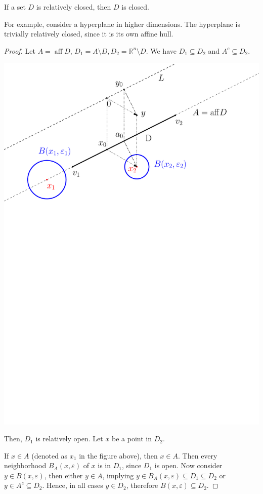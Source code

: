 \begin{theorem}
  If a set \( D \) is relatively closed, then \( D \) is closed.
\end{theorem}

For example, consider a hyperplane in higher dimensions. The hyperplane is
trivially relatively closed, since it is its own affine hull.

\begin{proof}
  Let \( A = \operatorname{aff} D \), \( D_{1} = A \setminus D, D_{2} =
  \mathbb{R}^{n} \setminus D \). We have \( D_{1} \subseteq D_{2} \) and \(
  A^{c} \subseteq D_{2} \).

  \includegraphics[scale=0.5]{figures/a}
  

  Then, \( D_{1} \) is relatively open. Let \( x \) be a point in \( D_{2} \).

  If \( x \in A \) (denoted as \( x_{1} \) in the figure above),
  then \( x \in A \). Then every neighborhood \( B_{A}(x,
  \varepsilon) \) of \( x \) is in \( D_{1} \), since \( D_{1} \) is open. Now
  consider \( y \in B(x, \varepsilon) \), then either \( y \in A \), implying \(
  y \in B_{A}(x, \varepsilon) \subseteq D_{1} \subseteq D_{2}\) or \( y \in
  A^{c} \subseteq D_{2} \). Hence, in all cases \( y \in D_{2} \), therefore \(
  B(x, \varepsilon) \subseteq D_{2}\).


\end{proof}
